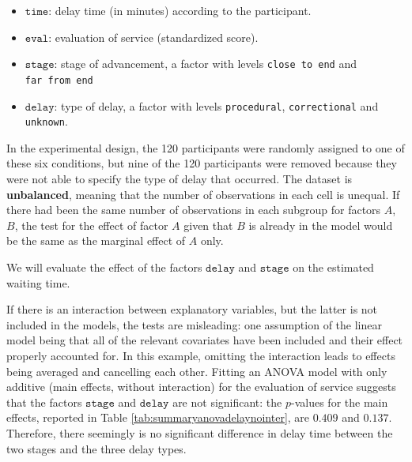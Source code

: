 \documentclass[
  11pt,
  letterpaper,
]{book}
\providecommand{\tightlist}{%
  \setlength{\itemsep}{0pt}\setlength{\parskip}{0pt}}
\theoremstyle{definition}
\theoremstyle{definition}
\theoremstyle{definition}
\theoremstyle{remark}
\begin{document}
\begin{itemize}
\tightlist
\item
  \(\texttt{time}\): delay time (in minutes) according to the participant.
\item
  \(\texttt{eval}\): evaluation of service (standardized score).
\item
  \(\texttt{stage}\): stage of advancement, a factor with levels \texttt{close\ to\ end} and \texttt{far\ from\ end}
\item
  \(\texttt{delay}\): type of delay, a factor with levels \texttt{procedural}, \texttt{correctional} and \texttt{unknown}.
\end{itemize}

In the experimental design, the 120 participants were randomly assigned to one of these six conditions, but nine of the 120 participants were removed because they were not able to specify the type of delay that occurred. The dataset is \textbf{unbalanced}, meaning that the number of observations in each cell is unequal. If there had been the same number of observations in each subgroup for factors \(A\), \(B\), the test for the effect of factor \(A\) given that \(B\) is already in the model would be the same as the marginal effect of \(A\) only.

We will evaluate the effect of the factors \(\texttt{delay}\) and \(\texttt{stage}\) on the estimated waiting time.

If there is an interaction between explanatory variables, but the latter is not included in the models, the tests are misleading: one assumption of the linear model being that all of the relevant covariates have been included and their effect properly accounted for. In this example, omitting the interaction leads to effects being averaged and cancelling each other. Fitting an ANOVA model with only additive (main effects, without interaction) for the evaluation of service suggests that the factors \(\texttt{stage}\) and \(\texttt{delay}\) are not significant: the \(p\)-values for the main effects, reported in Table \ref{tab:summaryanovadelaynointer}, are \(0.409\) and \(0.137\). Therefore, there seemingly is no significant difference in delay time between the two stages and the three delay types.
\end{document}
